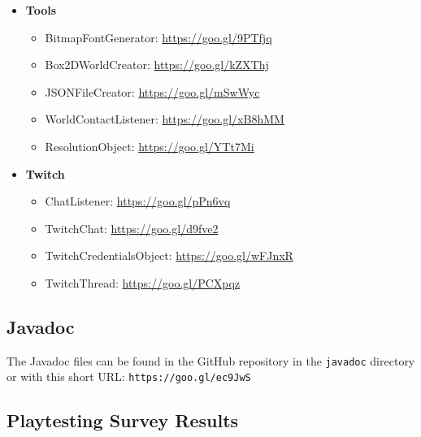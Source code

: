 \documentclass[12p]{article}
\begin{document}
\begin{itemize}
    \item \textbf{Tools}
    \begin{itemize}
        \item BitmapFontGenerator: \url{https://goo.gl/9PTfjq}
        \item Box2DWorldCreator: \url{https://goo.gl/kZXThj}
        \item JSONFileCreator: \url{https://goo.gl/mSwWyc}
        \item WorldContactListener: \url{https://goo.gl/xB8hMM}
        \item ResolutionObject: \url{https://goo.gl/YTt7Mi}
    \end{itemize}
    
    \item \textbf{Twitch}
    \begin{itemize}
        \item ChatListener: \url{https://goo.gl/pPn6vq}
        \item TwitchChat: \url{https://goo.gl/d9fve2}
        \item TwitchCredentialsObject: \url{https://goo.gl/wFJnxR}
        \item TwitchThread: \url{https://goo.gl/PCXpqz}
    \end{itemize}
\end{itemize}


\subsection{Javadoc} \label{Javadoc}

The Javadoc files can be found in the GitHub repository in the \texttt{javadoc} directory or with this short URL: \texttt{https://goo.gl/ec9JwS}


\subsection{Playtesting Survey Results} \label{SurveyResults}
\end{document}
